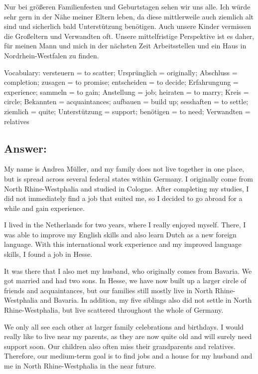 \documentclass[a4paper,12pt]{article}
\begin{document}
Nur bei größeren Familienfesten und Geburtstagen sehen wir uns alle. Ich würde sehr gern in der Nähe meiner Eltern leben, da diese mittlerweile auch ziemlich alt sind und sicherlich bald Unterstützung benötigen. Auch unsere Kinder vermissen die Großeltern und Verwandten oft. Unsere mittelfristige Perspektive ist es daher, für meinen Mann und mich in der nächsten Zeit Arbeitsstellen und ein Haus in Nordrhein-Westfalen zu finden.

\vspace{0.5cm}

Vocabulary: 
versteuern = to scatter; Ursprünglich = originally; Abschluss = completion; zusagen = to promise; entscheiden = to decide; Erfahrungung = experience; sammeln = to gain; Anstellung = job; heiraten = to marry; Kreis = circle; Bekannten = acquaintances; aufbauen = build up; sesshaften = to settle; ziemlich = quite; Unterstützung = support; benötigen = to need; Verwandten = relatives

\subsection*{Answer:}

My name is Andrea Müller, and my family does not live together in one place, but is spread across several federal states within Germany. I originally come from North Rhine-Westphalia and studied in Cologne. After completing my studies, I did not immediately find a job that suited me, so I decided to go abroad for a while and gain experience.

I lived in the Netherlands for two years, where I really enjoyed myself. There, I was able to improve my English skills and also learn Dutch as a new foreign language. With this international work experience and my improved language skills, I found a job in Hesse.

It was there that I also met my husband, who originally comes from Bavaria. We got married and had two sons. In Hesse, we have now built up a larger circle of friends and acquaintances, but our families still mostly live in North Rhine-Westphalia and Bavaria. In addition, my five siblings also did not settle in North Rhine-Westphalia, but live scattered throughout the whole of Germany.

We only all see each other at larger family celebrations and birthdays. I would really like to live near my parents, as they are now quite old and will surely need support soon. Our children also often miss their grandparents and relatives. Therefore, our medium-term goal is to find jobs and a house for my husband and me in North Rhine-Westphalia in the near future.
\end{document}
